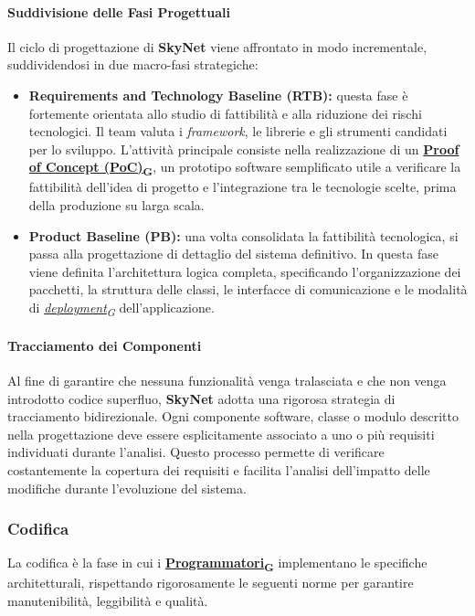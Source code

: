 \documentclass[12pt, a4paper]{article}
\newcommand{\urlglossario}{https://skynetunigroup.github.io/Code_Guardian/Documentazione/RTB/glossario_v1.0.0.pdf} %
\newcommand{\glo}[2]{\href{\urlglossario\#nameddest=#2}{#1\textsubscript{G}}}
\begin{document}
\paragraph{Suddivisione delle Fasi Progettuali}
Il ciclo di progettazione di \textbf{SkyNet} viene affrontato in modo incrementale, suddividendosi in due macro-fasi strategiche:
\begin{itemize}
    \item \textbf{Requirements and Technology Baseline (RTB):} questa fase è fortemente orientata allo studio di fattibilità e alla riduzione dei rischi tecnologici. Il team valuta i \textit{framework}, le librerie e gli strumenti candidati per lo sviluppo. L'attività principale consiste nella realizzazione di un \textbf{\glo{Proof of Concept (PoC)}{poc}}, un prototipo software semplificato utile a verificare la fattibilità dell'idea di progetto e l'integrazione tra le tecnologie scelte, prima della produzione su larga scala.
    \item \textbf{Product Baseline (PB):} una volta consolidata la fattibilità tecnologica, si passa alla progettazione di dettaglio del sistema definitivo. In questa fase viene definita l'architettura logica completa, specificando l'organizzazione dei pacchetti, la struttura delle classi, le interfacce di comunicazione e le modalità di \textit{\glo{deployment}{deployment}} dell'applicazione.
\end{itemize}

\paragraph{Tracciamento dei Componenti}
Al fine di garantire che nessuna funzionalità venga tralasciata e che non venga introdotto codice superfluo, \textbf{SkyNet} adotta una rigorosa strategia di tracciamento bidirezionale. Ogni componente software, classe o modulo descritto nella progettazione deve essere esplicitamente associato a uno o più requisiti individuati durante l'analisi. Questo processo permette di verificare costantemente la copertura dei requisiti e facilita l'analisi dell'impatto delle modifiche durante l'evoluzione del sistema.

\subsubsection{Codifica}
La codifica è la fase in cui i \textbf{\glo{Programmatori}{programmatore}} implementano le specifiche architetturali, rispettando rigorosamente le seguenti norme per garantire manutenibilità, leggibilità e qualità.
\end{document}
